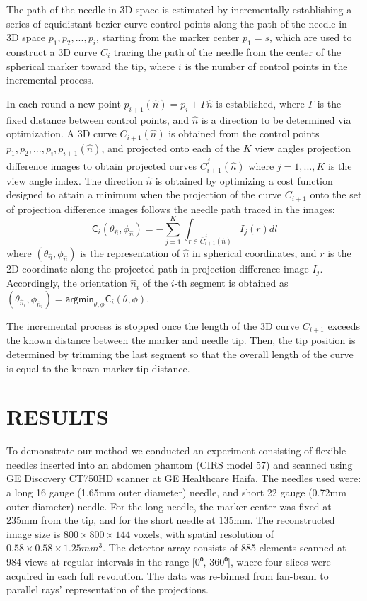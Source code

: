 \documentclass[letterpaper, 10 pt, conference]{ieeeconf}  %
\begin{document}
The path of the needle in 3D space is estimated by incrementally establishing a series of equidistant bezier curve control points along the path of the needle in 3D space $p_1, p_2, ..., p_i$, starting from the marker center $p_1=s$, which are used to construct a 3D curve $C_i$ tracing the path of the needle from the center of the spherical marker toward the tip, where $i$ is the number of control points in the incremental process. 

In each round a new point $p_{i+1}(\hat{n}) = p_i + \Gamma \hat{n}$ is established, where $\Gamma$ is the fixed distance between control points, and $\hat{n}$ is a direction to be determined via optimization. 
A 3D curve $C_{i+1}(\hat{n})$ is obtained from the control points $p_1, p_2, ..., p_i, p_{i+1}(\hat{n})$, and projected onto each of the $K$ view angles projection difference images to obtain projected curves $\bar{C}_{i+1}^j(\hat{n})$ where $j=1,...,K$ is the view angle index.
The direction $\hat{n}$ is obtained by optimizing a cost function designed to attain a minimum when the projection of the curve $C_{i+1}$ onto the set of projection difference images follows the needle path traced in the images:
\[ \textsf{C}_i(\theta_{\hat{n}}, \phi_{\hat{n}}) = -\sum_{j=1}^K{\int_{r \in \bar{C}_{i+1}^j(\hat{n})} {I_j(r)dl}} \]
where $ (\theta_{\hat{n}}, \phi_{\hat{n}}) $ is the representation of $ \hat{n} $ in spherical coordinates, and $r$ is the 2D coordinate along the projected path in projection difference image $I_j$. 
Accordingly, the orientation $\hat{n}_i$ of the $i$-th segment is obtained as $(\theta_{\hat{n}_i}, \phi_{\hat{n}_i}) = \textsf{argmin}_{\theta, \phi} \textsf{C}_i ( \theta, \phi)$.

The incremental process is stopped once the length of the 3D curve $C_{i+1}$ exceeds the known distance between the marker and needle tip. Then, the tip position is determined by trimming the last segment so that the overall length of the curve is equal to the known marker-tip distance.

\section{RESULTS}

To demonstrate our method we conducted an experiment consisting of flexible needles inserted into an abdomen phantom (CIRS model 57) and scanned using GE Discovery CT750HD scanner at GE Healthcare Haifa. The needles used were: a long 16 gauge (1.65mm outer diameter) needle, and short 22 gauge (0.72mm outer diameter) needle. For the long needle, the marker center was fixed at 235mm from the tip, and for the short needle at 135mm.
The reconstructed image size is $ 800 \times 800 \times 144 $ voxels, with spatial resolution of $0.58 \times 0.58 \times 1.25mm^3$. The detector array consists of 885 elements scanned at 984 views at regular intervals in the range [0⁰, 360⁰], where four slices were acquired in each full revolution. The data was re-binned from fan-beam to parallel rays’ representation of the projections.
\end{document}
